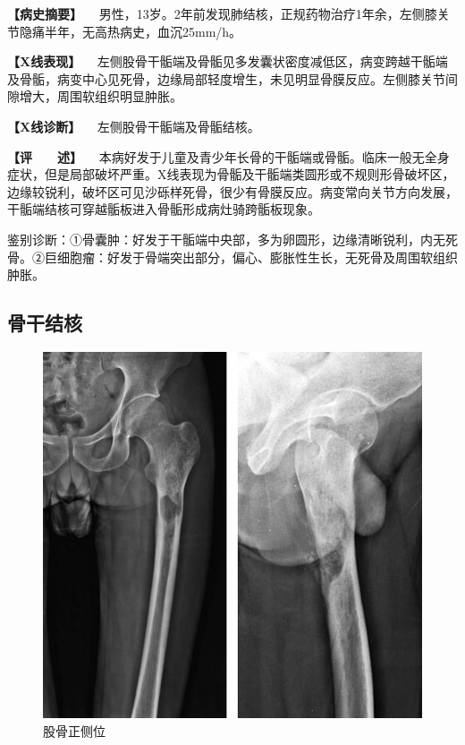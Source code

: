 \textbf{【病史摘要】}
　男性，13岁。2年前发现肺结核，正规药物治疗1年余，左侧膝关节隐痛半年，无高热病史，血沉25mm/h。

\textbf{【X线表现】}
　左侧股骨干骺端及骨骺见多发囊状密度减低区，病变跨越干骺端及骨骺，病变中心见死骨，边缘局部轻度增生，未见明显骨膜反应。左侧膝关节间隙增大，周围软组织明显肿胀。

\textbf{【X线诊断】} 　左侧股骨干骺端及骨骺结核。

\textbf{【评　　述】}
　本病好发于儿童及青少年长骨的干骺端或骨骺。临床一般无全身症状，但是局部破坏严重。X线表现为骨骺及干骺端类圆形或不规则形骨破坏区，边缘较锐利，破坏区可见沙砾样死骨，很少有骨膜反应。病变常向关节方向发展，干骺端结核可穿越骺板进入骨骺形成病灶骑跨骺板现象。

鉴别诊断：①骨囊肿：好发于干骺端中央部，多为卵圆形，边缘清晰锐利，内无死骨。②巨细胞瘤：好发于骨端突出部分，偏心、膨胀性生长，无死骨及周围软组织肿胀。

\subsection{骨干结核}

\begin{figure}[!htbp]
 \centering
 \includegraphics{./images/Image00077.jpg}
 \captionsetup{justification=centering}
 \caption{股骨正侧位}
 \label{fig2-6-2}
  \end{figure} 

